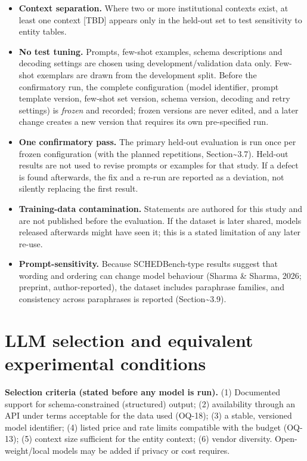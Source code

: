 \documentclass[
  11pt,a4paper,oneside]{report}
\begin{document}
\begin{itemize}
  variants. Families, not statements, are assigned to splits, so
  near-duplicates cannot straddle development and test.
\item
  \textbf{Context separation.} Where two or more institutional contexts
  exist, at least one context {[}TBD{]} appears only in the held-out set
  to test sensitivity to entity tables.
\item
  \textbf{No test tuning.} Prompts, few-shot examples, schema
  descriptions and decoding settings are chosen using
  development/validation data only. Few-shot exemplars are drawn from
  the development split. Before the confirmatory run, the complete
  configuration (model identifier, prompt template version, few-shot set
  version, schema version, decoding and retry settings) is \emph{frozen}
  and recorded; frozen versions are never edited, and a later change
  creates a new version that requires its own pre-specified run.
\item
  \textbf{One confirmatory pass.} The primary held-out evaluation is run
  once per frozen configuration (with the planned repetitions,
  Section\textasciitilde3.7). Held-out results are not used to revise
  prompts or examples for that study. If a defect is found afterwards,
  the fix and a re-run are reported as a deviation, not silently
  replacing the first result.
\item
  \textbf{Training-data contamination.} Statements are authored for this
  study and are not published before the evaluation. If the dataset is
  later shared, models released afterwards might have seen it; this is a
  stated limitation of any later re-use.
\item
  \textbf{Prompt-sensitivity.} Because SCHEDBench-type results suggest
  that wording and ordering can change model behaviour (Sharma \&
  Sharma, 2026; preprint, author-reported), the dataset includes
  paraphrase families, and consistency across paraphrases is reported
  (Section\textasciitilde3.9).
\end{itemize}

\hypertarget{llm-selection-and-equivalent-experimental-conditions}{%
\section{LLM selection and equivalent experimental
conditions}\label{llm-selection-and-equivalent-experimental-conditions}}

\textbf{Selection criteria (stated before any model is run).} (1)
Documented support for schema-constrained (structured) output; (2)
availability through an API under terms acceptable for the data used
(OQ-18); (3) a stable, versioned model identifier; (4) listed price and
rate limits compatible with the budget (OQ-13); (5) context size
sufficient for the entity context; (6) vendor diversity.
Open-weight/local models may be added if privacy or cost requires.
\end{document}

